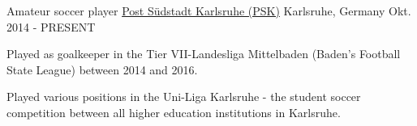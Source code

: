 

\begin{cventries}

  \cventry
    {Amateur soccer player} %
    {\href{https://www.fupa.net/player/nv-martin-loper-702462}{Post Südstadt Karlsruhe (PSK)}} %
    {Karlsruhe, Germany} %
    {Okt. 2014 - PRESENT} %
    {
      \begin{cvitems} %
        \item {Played as goalkeeper in the Tier VII-Landesliga Mittelbaden (Baden's Football State League) between 2014 and 2016.}
        \item {Played various positions in the Uni-Liga Karlsruhe - the student soccer competition between all higher education institutions in Karlsruhe.}
      \end{cvitems}
    }

\end{cventries}
